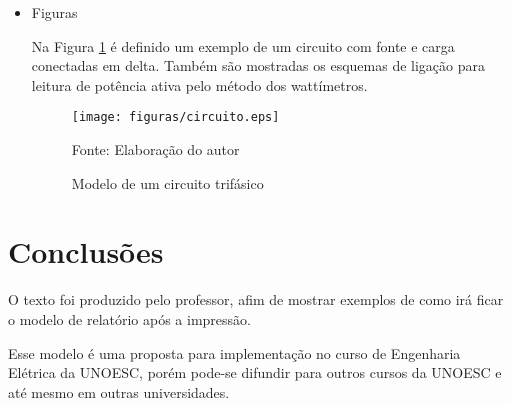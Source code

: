 \documentclass[a4paper,12pt,ruledheader,onecolumn,ceqn]{article}
\begin{document}
\begin{itemize}
\item Figuras

Na Figura \ref{Fig:circuito} é definido um exemplo de um circuito com fonte e carga conectadas em delta. Também são mostradas os esquemas de ligação para leitura de potência ativa pelo método dos wattímetros.

\begin{figure}[ht!]
\centering
\caption{Modelo de um circuito trifásico \label{Fig:circuito}}
\vspace{-0.5cm}
\texttt{[image: figuras/circuito.eps]}

{Fonte: Elaboração do autor}
\end{figure}
\end{itemize}

\section{Conclusões}
O texto foi produzido pelo professor, afim de mostrar exemplos de como irá ficar o modelo de relatório após a impressão.

Esse modelo é uma proposta para implementação no curso de Engenharia Elétrica da UNOESC, porém pode-se difundir para outros cursos da UNOESC e até mesmo em outras universidades.



\end{document}
